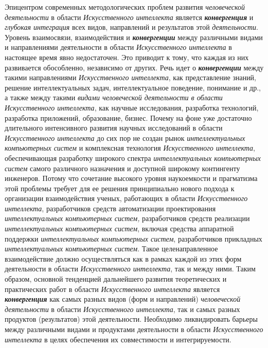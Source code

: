 Эпицентром современных методологических проблем развития \textit{человеческой} \textit{деятельности} в области \textit{Искусственного интеллекта} является \textbf{\textit{конвергенция}} и \textit{глубокая интеграция} всех видов, направлений и результатов этой \textit{деятельности}. Уровень взаимосвязи, взаимодействия и \textbf{\textit{конвергенции}} между различными видами и направлениями деятельности в области \textit{Искусственного интеллекта} в настоящее время явно недостаточен. Это приводит к тому, что каждая из них развивается обособленно, независимо от других. Речь идет о \textbf{\textit{конвергенции}} между такими направлениями \textit{Искусственного интеллекта}, как представление знаний, решение интеллектуальных задач, интеллектуальное поведение, понимание и др., а также между такими \textit{видами человеческой деятельности в области Искусственного интеллекта}, как научные исследования, разработка технологий, разработка приложений, образование, бизнес. Почему на фоне уже достаточно длительного интенсивного развития научных исследований в области \textit{Искусственного интеллекта} до сих пор не создан рынок \textit{интеллектуальных компьютерных систем} и комплексная технология \textit{Искусственного интеллекта}, обеспечивающая разработку широкого спектра \textit{интеллектуальных компьютерных систем} самого различного назначения и доступной широкому контингенту инженеров. Потому что сочетание высокого уровня наукоемкости и прагматизма этой проблемы требует для ее решения принципиально нового подхода к организации взаимодействия ученых, работающих в области \textit{Искусственного интеллекта}, разработчиков средств автоматизации проектирования \textit{интеллектуальных компьютерных систем,} разработчиков средств реализации \textit{интеллектуальных компьютерных систем}, включая средства аппаратной поддержки \textit{интеллектуальных компьютерных систем}, разработчиков прикладных \textit{интеллектуальных компьютерных систем}. Такое целенаправленное взаимодействие должно осуществляться как в рамках каждой из этих форм деятельности в области \textit{Искусственного интеллекта}, так и между ними. Таким образом, основной тенденцией дальнейшего развития теоретических и практических работ в области \textit{Искусственного интеллекта} является \textbf{\textit{конвергенция}} как самых разных видов (форм и направлений) \textit{человеческой деятельности} в области \textit{Искусственного интеллекта}, так и самых разных продуктов (результатов) этой деятельности. Необходимо ликвидировать барьеры между различными видами и продуктами деятельности в области \textit{Искусственного интеллекта} в целях обеспечения их совместимости и интегрируемости.

